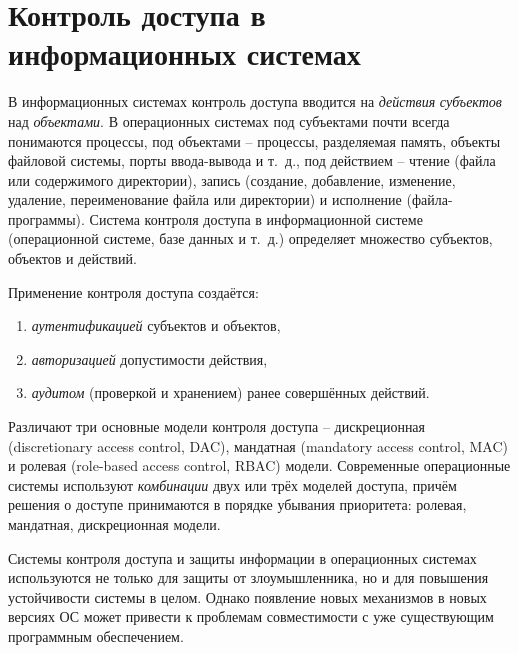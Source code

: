 \section[Контроль доступа в информационных системах]{Контроль доступа в \protect\\ информационных системах}


В информационных системах контроль доступа вводится на \emph{действия} \emph{субъектов} над \emph{объектами}. В операционных системах под субъектами почти всегда понимаются процессы, под объектами -- процессы, разделяемая память, объекты файловой системы, порты ввода-вывода и т.~д., под действием -- чтение (файла или содержимого директории), запись (создание, добавление, изменение, удаление, переименование файла или директории) и исполнение (файла-программы). Система контроля доступа в информационной системе (операционной системе, базе данных и т.~д.) определяет множество субъектов, объектов и действий.

Применение контроля доступа создаётся:

\begin{enumerate}
	\item \emph{аутентификацией} субъектов и объектов,
	\item \emph{авторизацией} допустимости действия,
	\item \emph{аудитом} (проверкой и хранением) ранее совершённых действий.
\end{enumerate}

Различают три основные модели контроля доступа -- дискреционная (discretionary access control, DAC), мандатная (mandatory access control, MAC) и ролевая (role-based access control, RBAC) модели. Современные операционные системы используют \emph{комбинации} двух или трёх моделей доступа, причём решения о доступе принимаются в порядке убывания приоритета: ролевая, мандатная, дискреционная модели.

Системы контроля доступа и защиты информации в операционных системах используются не только для защиты от злоумышленника, но и для повышения устойчивости системы в целом. Однако появление новых механизмов в новых версиях ОС может привести к проблемам совместимости с уже существующим программным обеспечением.


